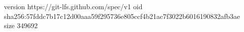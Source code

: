 version https://git-lfs.github.com/spec/v1
oid sha256:57fddc7b17c12d00aaa59f295736e805ccf4b21ac7f3022b6016190832afb3ae
size 349692

